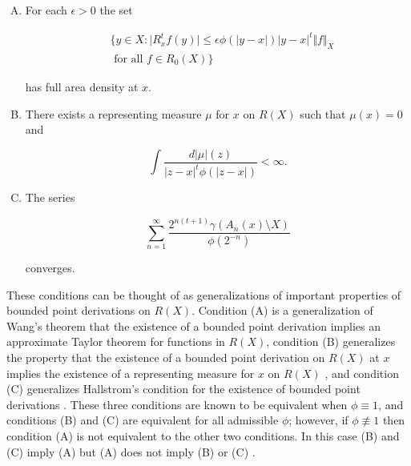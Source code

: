 \documentclass{article}
\theoremstyle{definition}
\begin{document}
\begin{enumerate}[(A)]
    \item For each $\epsilon >0 $ the set 
    
    \begin{align*}
   & \{y\in X: \vert R_x^t f(y) \vert \leq \epsilon \phi(\vert y-x \vert)\vert y-x \vert^t \Vert f \Vert_X \\ &\text{ for all }  f \in R_0(X)\}
    \end{align*}
    
   \noindent has full area density at $x$.
    
    \item There exists a representing measure $\mu$ for $x$ on $R(X)$ such that $\mu(x) = 0$ and 
    
    \begin{equation*} 
    \int \dfrac{d \vert \mu \vert(z)}{\vert z-x \vert^t\phi(\vert z-x \vert)} < \infty.
    \end{equation*}
    
    \item The series 
    
    \begin{equation*}
        \sum_{n=1}^{\infty} \dfrac{2^{n(t+1)}\gamma(A_n(x) \setminus X)}{\phi(2^{-n})} 
    \end{equation*}
    
 \noindent converges.
    
\end{enumerate}

These conditions can be thought of as generalizations of important properties of bounded point derivations on $R(X)$. Condition (A) is a generalization of Wang's theorem \cite[Theorem 3.4]{Wang1973} that the existence of a bounded point derivation implies an approximate Taylor theorem for functions in $R(X)$, condition (B) generalizes the property that the existence of a bounded point derivation on $R(X)$ at $x$ implies the existence of a representing measure for $x$ on $R(X)$ \cite[pg. 351]{Wang1973}, and condition (C) generalizes Hallstrom's condition for the existence of bounded point derivations \cite{Hallstrom1969}. These three conditions are known to be equivalent when $\phi \equiv 1$, and conditions (B) and (C) are equivalent for all admissible $\phi$; however, if $\phi \not \equiv 1$ then condition (A) is not equivalent to the other two conditions. In this case (B) and (C) imply (A) but (A) does not imply (B) or (C) \cite{O'Farrell1978}.
\end{document}
